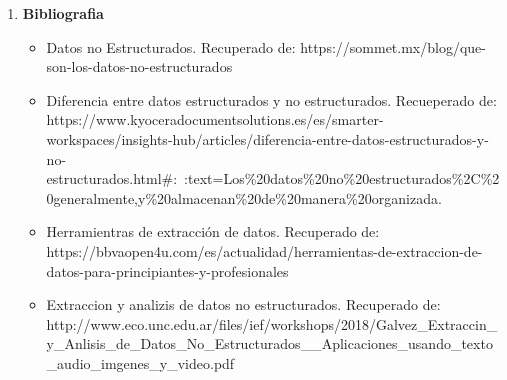 \documentclass[12pt,a4paper,oneside]{book}
\begin{document}
\begin{enumerate}
		\item \textbf{Bibliografia } 
				
			\begin{itemize}
			
			 
			\item Datos no Estructurados. 
			Recuperado de: https://sommet.mx/blog/que-son-los-datos-no-estructurados
			
			 \item Diferencia entre datos estructurados y no estructurados. Recueperado de: https://www.kyoceradocumentsolutions.es/es/smarter-workspaces/insights-hub/articles/diferencia-entre-datos-estructurados-y-no-estructurados.html#:~:text=Los\%20datos\%20no\%20estructurados\%2C\%20generalmente,y\%20almacenan\%20de\%20manera\%20organizada.
			
			\item Herramientras de extracción de datos. 
			Recuperado de: https://bbvaopen4u.com/es/actualidad/herramientas-de-extraccion-de-datos-para-principiantes-y-profesionales
			
			\item Extraccion y analizis de datos no estructurados.
			Recuperado de: http://www.eco.unc.edu.ar/files/ief/workshops/2018/Galvez_Extraccin_y_Anlisis_de_Datos_No_Estructurados__Aplicaciones_usando_texto_audio_imgenes_y_video.pdf
			
			
			
			
		\end{itemize}
		
		
		
	\end{enumerate}
	
	
\end{document}
